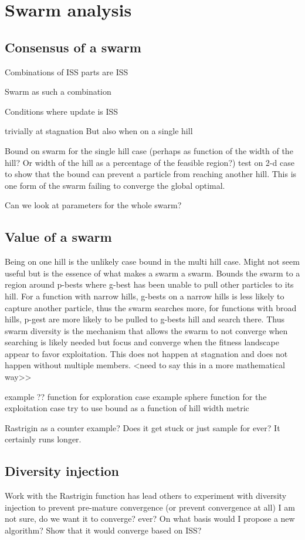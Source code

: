 \section{Swarm analysis}
\label{sec:swarm}

\subsection{Consensus of a swarm}

Combinations of ISS parts are ISS

Swarm as such a combination

Conditions where update is ISS

trivially at stagnation
But also when on a single hill

Bound on swarm for the single hill case (perhaps as function of the width of the hill?
Or width of the hill as a percentage of the feasible region?)
test on 2-d case to show that the bound can prevent a particle    from reaching another hill.
This is one form of the swarm failing to converge the global optimal.

Can we look at parameters for the whole swarm?

\subsection{Value of a swarm}

Being on one hill is the unlikely case bound in the multi hill case.
Might not seem useful but is the essence of what makes a swarm a swarm.
Bounds the swarm to a region around p-bests where g-best has been unable to pull other particles to its hill.
For a function with narrow hills, g-bests on a narrow hills is less likely to capture another particle, thus the swarm searches more, for functions with broad hills, p-gest are more likely to be pulled to g-bests hill and search there.
Thus swarm diversity is the mechanism that allows the swarm to not converge when searching is likely needed but focus and converge when the fitness landscape appear to favor exploitation.
This does not happen at stagnation and does not happen without multiple members. <need to say this in a more mathematical way>>

example ?? function for exploration case
example sphere function for the exploitation case
try to use bound as a function of hill width metric

Rastrigin as a counter example? Does it get stuck or just sample for ever? It certainly runs longer.

\subsection{Diversity injection}

Work with the Rastrigin function has lead others to experiment with diversity injection to prevent pre-mature convergence (or prevent convergence at all)
I am not sure, do we want it to converge? ever?
On what basis would I propose a new algorithm?
Show that it would converge based on ISS?
